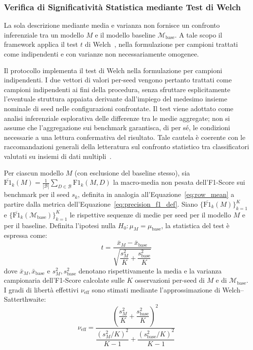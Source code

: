 \subsubsection{Verifica di Significatività Statistica mediante Test di Welch}
\label{subsubsec:welch_test}
La sola descrizione mediante media e varianza non fornisce un confronto inferenziale tra un modello $M$ e il modello baseline $\mathcal{M}_{\text{base}}$. A tale scopo il framework applica il test $t$ di Welch~\cite{welch1947}, nella formulazione per campioni trattati come indipendenti e con varianze non necessariamente omogenee.

Il protocollo implementa il test di Welch nella formulazione per campioni indipendenti. I due vettori di valori per-seed vengono pertanto trattati come campioni indipendenti ai fini della procedura, senza sfruttare esplicitamente l'eventuale struttura appaiata derivante dall'impiego del medesimo insieme nominale di seed nelle configurazioni confrontate. Il test viene adottato come analisi inferenziale esplorativa delle differenze tra le medie aggregate; non si assume che l'aggregazione sui benchmark garantisca, di per sé, le condizioni necessarie a una lettura confermativa del risultato. Tale cautela è coerente con le raccomandazioni generali della letteratura sul confronto statistico tra classificatori valutati su insiemi di dati multipli~\cite{demsar2006}.

Per ciascun modello $M$ (con esclusione del baseline stesso), sia $\overline{\text{F1}}_k(M) = \frac{1}{|\mathcal{B}|}\sum_{D\in\mathcal{B}} \text{F1}_k(M,D)$ la macro-media non pesata dell'F1-Score sui benchmark per il seed $s_k$, definita in analogia all'Equazione~\eqref{eq:row_mean} a partire dalla metrica dell'Equazione~\eqref{eq:precision_f1_def}. Siano $\{\overline{\text{F1}}_k(M)\}_{k=1}^{K}$ e $\{\overline{\text{F1}}_k(\mathcal{M}_{\text{base}})\}_{k=1}^{K}$ le rispettive sequenze di medie per seed per il modello $M$ e per il baseline. Definita l'ipotesi nulla $H_0: \mu_M = \mu_{\text{base}}$, la statistica del test è espressa come:
\begin{equation}
    t = \frac{\bar{x}_M - \bar{x}_{\text{base}}}{\sqrt{\dfrac{s_M^2}{K} + \dfrac{s_{\text{base}}^2}{K}}}
    \label{eq:welch_statistic}
\end{equation}
dove $\bar{x}_M, \bar{x}_{\text{base}}$ e $s_M^2, s_{\text{base}}^2$ denotano rispettivamente la media e la varianza campionaria dell'F1-Score calcolate sulle $K$ osservazioni per-seed di $M$ e di $\mathcal{M}_{\text{base}}$. I gradi di libertà effettivi $\nu_{\text{eff}}$ sono stimati mediante l'approssimazione di Welch--Satterthwaite:
\begin{equation}
    \nu_{\text{eff}} = \frac{\left( \dfrac{s_M^2}{K} + \dfrac{s_{\text{base}}^2}{K} \right)^2}{\dfrac{(s_M^2/K)^2}{K-1} + \dfrac{(s_{\text{base}}^2/K)^2}{K-1}}
    \label{eq:welch_dof}
\end{equation}

